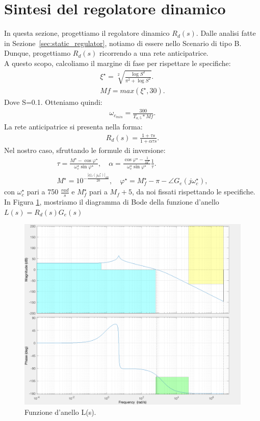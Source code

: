 \documentclass[a4paper, 11pt]{article}
\begin{document}
\section{Sintesi del regolatore dinamico}
\label{sec:dynamic_regulator}

In questa sezione, progettiamo il regolatore dinamico $R_d(s)$. 
%
Dalle analisi fatte in Sezione~\ref{sec:static_regulator}, notiamo di essere nello Scenario di tipo B. Dunque, progettiamo $R_d(s)$ ricorrendo a una rete anticipatrice.\\
A questo scopo, calcoliamo il margine di fase per rispettare le specifiche:
\begin{align}
	\xi^{\star} = \sqrt[2]{\frac{\log{S}^2}{\pi^2 + \log{S}^2}}.
	\\[0.5em]
	Mf = max (\xi^{\star}, 30).
\end{align}
Dove S=0.1. Otteniamo quindi:
\begin{align}
	\omega_{c_{min}}=\frac{300}{T_{a, 5}*Mf}.
\end{align}
La rete anticipatrice si presenta nella forma:
\begin{align}
	R_d(s) = \frac{1+\tau s}{1+\alpha \tau s}.
\end{align}
Nel nostro caso, sfruttando le formule di inversione:
\begin{align}
	\tau = \frac{M^{\star}-\cos{\varphi^{\star}}}{\omega_c^{\star}\sin{\varphi^{\star}}}, \quad
	\alpha = \frac{\cos{\varphi^{\star}-\frac{1}{M^{\star}}}}{\omega_c^{\star}\sin{\varphi^{\star}}}\frac{1}{\tau}.
	\\[1em]
	M^{\star} = 10^{-\frac{\left|G_e(j\omega_c^{\star})\right|_{dB}}{20}}, \quad
	\varphi^{\star} = M_f^{\star} -\pi - \angle{G_e(j\omega_c^{\star})},
\end{align}
con $\omega_c^{\star}$ pari a 750 $\frac{rad}{s}$ e $M_f^{\star}$ pari a $M_f + 5$, da noi fissati rispettando le specifiche.\\

In Figura \ref{fig:funzione_anello}, mostriamo il diagramma di Bode della funzione d'anello $L(s) = R_d(s) G_e(s)$

\begin{figure}[h!]
	\centering
	\includegraphics[width=0.75\linewidth]{./images/funzione_anello.png}
	\caption{Funzione d'anello L(s).}
	\label{fig:funzione_anello}
\end{figure}
\end{document}
